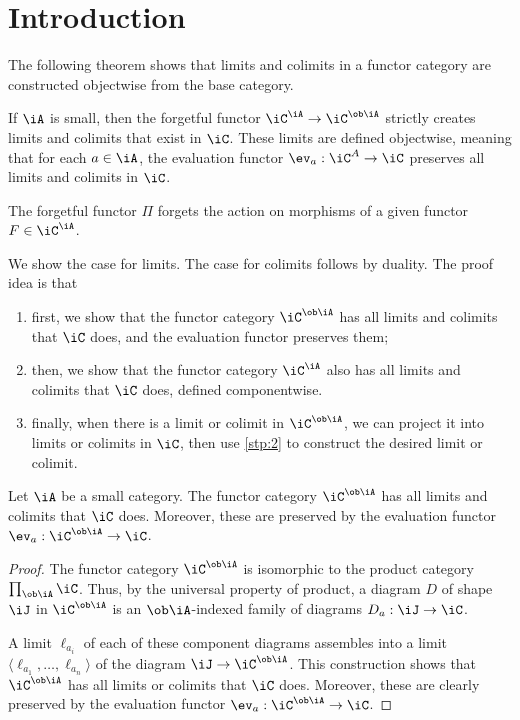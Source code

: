 \documentclass{amsart}
\title{}
\author{Frank Tsai}
\date{\today}
\begin{document}
\maketitle
\tableofcontents

\section{Introduction}
\label{sec:introduction}

The following theorem shows that limits and colimits in a functor category are constructed objectwise from the base category.
\begin{thm}\label{thm:objectwise}
  If $\iA$ is small, then the forgetful functor $\iC^{\iA} \to \iC^{\ob \iA}$ strictly creates limits and colimits that exist in $\iC$.
  These limits are defined objectwise, meaning that for each $a \in \iA$, the evaluation functor $\ev_{a} : \iC^{A} \to \iC$ preserves all limits and colimits in $\iC$.
\end{thm}
The forgetful functor $\Pi$ forgets the action on morphisms of a given functor $F \in \iC^{\iA}$.

We show the case for limits.
The case for colimits follows by duality.
The proof idea is that
\begin{enumerate}
\item first, we show that the functor category $\iC^{\ob \iA}$ has all limits and colimits that $\iC$ does, and the evaluation functor preserves them;
\item\label{stp:2} then, we show that the functor category $\iC^{\iA}$ also has all limits and colimits that $\iC$ does, defined componentwise.
\item finally, when there is a limit or colimit in $\iC^{\ob \iA}$, we can project it into limits or colimits in $\iC$, then use \ref{stp:2} to construct the desired limit or colimit.
\end{enumerate}

\begin{lem}\label{lem:step-1}
  Let $\iA$ be a small category.
  The functor category $\iC^{\ob \iA}$ has all limits and colimits that $\iC$ does.
  Moreover, these are preserved by the evaluation functor $\ev_{a} : \iC^{\ob \iA} \to \iC$.
\end{lem}
\begin{proof}
  The functor category $\iC^{\ob \iA}$ is isomorphic to the product category $\prod_{\ob \iA}\iC$.
  Thus, by the universal property of product, a diagram $D$ of shape $\iJ$ in $\iC^{\ob \iA}$ is an $\ob \iA$-indexed family of diagrams $D_{a} : \iJ \to \iC$.
  

  A limit $\ell_{a_{i}}$ of each of these component diagrams assembles into a limit $\langle \ell_{a_{1}},\ldots, \ell_{a_{n}} \rangle$ of the diagram $\iJ \to \iC^{\ob \iA}$.
  This construction shows that $\iC^{\ob \iA}$ has all limits or colimits that $\iC$ does.
  Moreover, these are clearly preserved by the evaluation functor $\ev_{a} : \iC^{\ob \iA} \to \iC$.
\end{proof}
\end{document}
